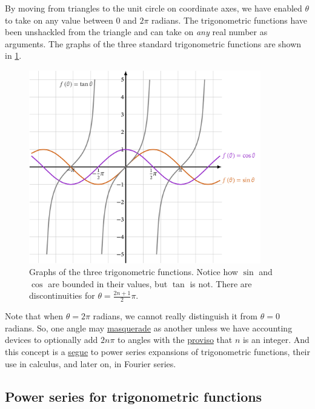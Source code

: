 \documentclass[
  a4paper,
]{article}
\begin{document}
By moving from triangles to the unit circle on coordinate axes, we have
enabled \(\theta\) to take on any value between 0 and \(2\pi\) radians.
The trigonometric functions have been unshackled from the triangle and
can take on \emph{any} real number as arguments. The graphs of the three
standard trigonometric functions are shown in \cref{fig:threegraph}.

\begin{figure}
\hypertarget{fig:threegraph}{%
\centering
\includegraphics[width=0.9\textwidth,height=\textheight]{images/threegraph.png}
\caption{Graphs of the three trigonometric functions. Notice how
\(\sin\) and \(\cos\) are bounded in their values, but \(\tan\) is not.
There are discontinuities for
\(\theta=\frac{2n+1}{2}\pi\).}\label{fig:threegraph}
}
\end{figure}

Note that when \(\theta = 2\pi\) radians, we cannot really distinguish
it from \(\theta=0\) radians. So, one angle may
\href{https://www.thefreedictionary.com/masquerade}{masquerade} as
another unless we have accounting devices to optionally add \(2n\pi\) to
angles with the
\href{https://dictionary.cambridge.org/dictionary/english/proviso}{proviso}
that \(n\) is an integer. And this concept is a
\href{https://www.dictionary.com/browse/segue}{segue} to power series
expansions of trigonometric functions, their use in calculus, and later
on, in Fourier series.

\hypertarget{power-series-for-trigonometric-functions}{%
\subsection{Power series for trigonometric
functions}\label{power-series-for-trigonometric-functions}}
\end{document}
